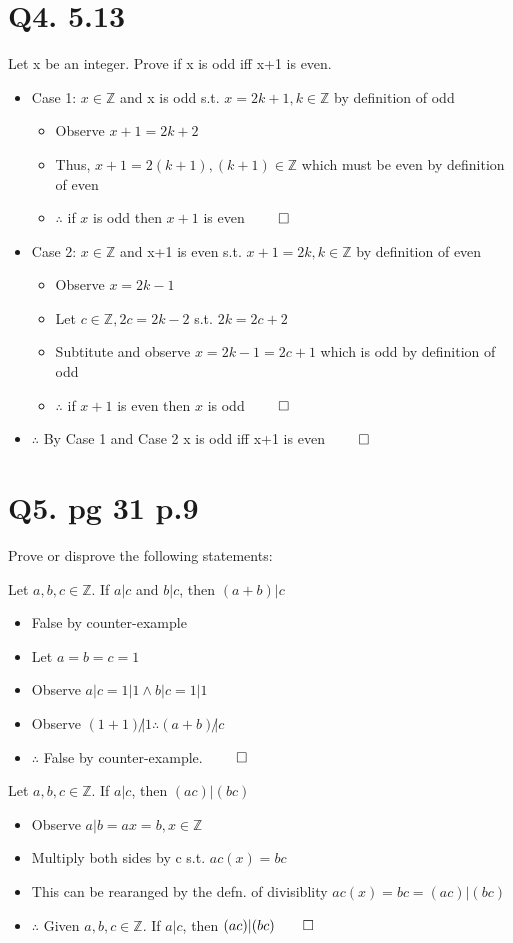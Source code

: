\documentclass[11pt]{article}
\theoremstyle{plain}
\begin{document}
\section{Q4. 5.13}
Let x be an integer. Prove if x is odd iff x+1 is even.

\begin{itemize}
    \item Case 1: $x \in \mathbb{Z}$ and x is odd s.t. $x = 2k+1, k \in \mathbb{Z}$ by definition of odd 
    \begin{itemize}
        \item Observe $x+1= 2k+2$
        \item Thus, $x+1 = 2(k+1), (k+1) \in \mathbb{Z}$ which must be even by definition of even
        \item $\therefore$ if $x$ is odd then $x+1$ is even $\qed$

    \end{itemize}
    \item Case 2: $x \in \mathbb{Z}$ and x+1 is even s.t. $x+1 = 2k, k \in \mathbb{Z}$ by definition of even
    \begin{itemize}
        \item Observe $x = 2k-1$ 
        \item Let $c \in \mathbb{Z}, 2c = 2k-2$ s.t. $2k = 2c + 2$
        \item Subtitute and observe $x = 2k-1 = 2c+1$ which is odd by definition of odd
        \item $\therefore$ if $x+1$ is even then $x$ is odd $\qed$
    \end{itemize}
    \item $\therefore$ By Case 1 and Case 2 x is odd iff x+1 is even $\qed$
\end{itemize}

\section{Q5. pg 31 p.9}
Prove or disprove the following statements: 

Let $a,b,c \in \mathbb{Z}$. If $a|c$ and $b|c$, then $(a+b)|c$
\begin{itemize}
    \item False by counter-example
    \item Let $a = b = c = 1$
    \item Observe $a|c = 1|1 \land b|c=1|1$
    \item Observe $(1+1) \not | 1 \therefore (a+b) \not | c$ 
    \item $\therefore$ False by counter-example. $\qed$
\end{itemize}

Let $a,b,c \in \mathbb{Z}$. If $a|c$, then $(ac)|(bc)$
\begin{itemize}
    \item Observe $a|b = ax=b, x \in \mathbb{Z}$
    \item Multiply both sides by c s.t. $ac(x) = bc$
    \item This can be rearanged by the defn. of divisiblity $ac(x) = bc = (ac)|(bc)$
    \item $\therefore$ Given $a,b,c \in \mathbb{Z}$. If $a|c$, then $(ac)|(bc) \qed$ 

\end{itemize}
\end{document}
